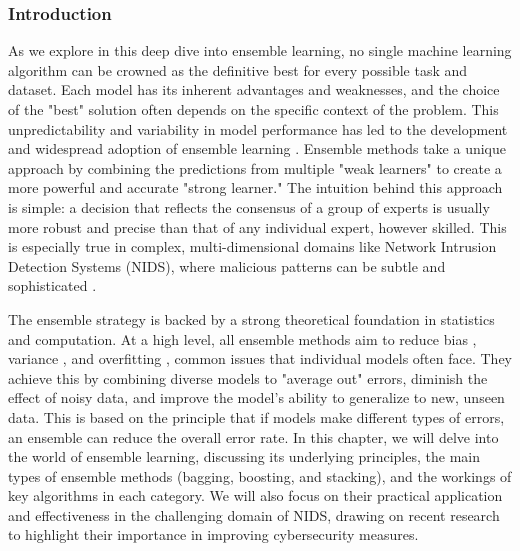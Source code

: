 \subsubsection{Introduction} 
As we explore in this deep dive into ensemble learning, no single machine learning algorithm can be crowned as the definitive best for every possible task and dataset. Each model has its inherent advantages and weaknesses, and the choice of the "best" solution often depends on the specific context of the problem. This unpredictability and variability in model performance has led to the development and widespread adoption of ensemble learning \parencite{al2020survey}. Ensemble methods take a unique approach by combining the predictions from multiple "weak learners" to create a more powerful and accurate "strong learner." The intuition behind this approach is simple: a decision that reflects the consensus of a group of experts is usually more robust and precise than that of any individual expert, however skilled. This is especially true in complex, multi-dimensional domains like Network Intrusion Detection Systems (NIDS), where malicious patterns can be subtle and sophisticated \parencite{aldhubaib2024network}.

The ensemble strategy is backed by a strong theoretical foundation in statistics and computation. At a high level, all ensemble methods aim to reduce bias , variance , and overfitting , common issues that individual models often face. They achieve this by combining diverse models to "average out" errors, diminish the effect of noisy data, and improve the model's ability to generalize to new, unseen data. This is based on the principle that if models make different types of errors, an ensemble can reduce the overall error rate. In this chapter, we will delve into the world of ensemble learning, discussing its underlying principles, the main types of ensemble methods (bagging, boosting, and stacking), and the workings of key algorithms in each category. We will also focus on their practical application and effectiveness in the challenging domain of NIDS, drawing on recent research to highlight their importance in improving cybersecurity measures.

